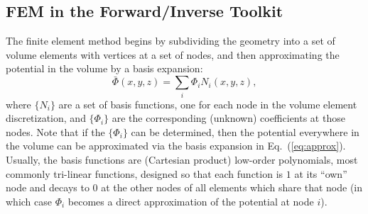 \subsection{FEM in the Forward/Inverse Toolkit}




The finite element method begins by subdividing the geometry into a set of
volume elements with vertices at a set of nodes, and then approximating
the potential in the volume by a basis expansion:
\begin{equation} \bar{\Phi}(x,y,z) = \sum_i \Phi_i
N_i(x,y,z), \label{eq:approx}
\end{equation}
\noindent where $\{N_i\}$ are a set of basis functions, one for each node in the
volume element discretization, and
$\{\Phi_i\}$ are the corresponding (unknown) coefficients at those nodes.
Note that if the
$\{\Phi_i\}$ can be determined, then the potential everywhere in the volume
can be approximated via the basis expansion in
Eq.~(\ref{eq:approx}). Usually, the basis functions are (Cartesian product)
low-order polynomials, most commonly tri-linear functions, designed so that
each function is $1$ at its ``own'' node and decays to $0$ at the other nodes of
all elements which share that node (in which case $\Phi_{i}$ becomes a
direct approximation of the potential at node $i$).


